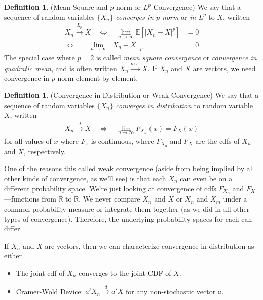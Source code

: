 \documentclass[12pt]{article}
\theoremstyle{plain}
\theoremstyle{definition}
\newtheorem{defn}[thm]{Definition}
\theoremstyle{remark}
\newcommand{\limn}{\lim_{n\rightarrow\infty}}
\newcommand{\R}{\mathbb{R}}
\newcommand{\E}{\mathbb{E}}
\newcommand{\msto}{\xrightarrow{m.s.}}
\newcommand{\dto}{\xrightarrow{d}}
\newcommand{\Lpto}{\xrightarrow{L_p}}
\begin{document}
\begin{defn}{(Mean Square and $p$-norm or $L^p$ Convergence)}
We say that a sequence of random variables $\{ X_n \}$
\emph{converges in $p$-norm} or \emph{in $L^p$} to $X$, written
\begin{align*}
  X_n \Lpto X
  \quad\iff\quad
  \limn \E\left[|X_n-X|^p\right] &= 0 \\
  \iff\quad\;\;\;
  \limn ||X_n-X||_p &= 0
\end{align*}
The special case where $p=2$ is called \emph{mean square convergence} or
\emph{convergence in quadratic mean}, and is often written $X_n\msto X$.
If $X_n$ and $X$ are vectors, we need convergence in $p$-norm
element-by-element.
\end{defn}


\begin{defn}{(Convergence in Distribution or Weak Convergence)}
\label{defn:convergeInDistribution}
We say that a sequence of random variables $\{X_n\}$
\emph{converges in distribution} to random variable $X$, written
\begin{align*}
  X_n\dto X
  \quad\iff\quad
  \limn F_{X_n}(x) = F_X(x)
\end{align*}
for all values of $x$ where $F_x$ is continuous,
where $F_{X_n}$ and $F_X$ are the cdfs of $X_n$ and $X$, respectively.

One of the reasons this called weak convergence (aside from being
implied by all other kinds of convergence, as we'll see) is that each
$X_n$ can even be on a different probability space. We're just looking
at convergence of cdfs $F_{X_n}$ and $F_X$---functions from $\R$ to
$\R$.  We never compare $X_n$ and $X$ or $X_n$ and $X_m$ under a common
probability measure or integrate them together (as we did in all other
types of convergence). Therefore, the underlying probability spaces for
each can differ.

If $X_n$ and $X$ are vectors, then we can characterize convergence
in distribution as either
\begin{itemize}
  \item The joint cdf of $X_n$ converges to the joint CDF of $X$.
  \item Cramer-Wold Device: $a'X_n \dto a'X$ for any non-stochastic
    vector $a$.
\end{itemize}
\end{defn}
\end{document}
